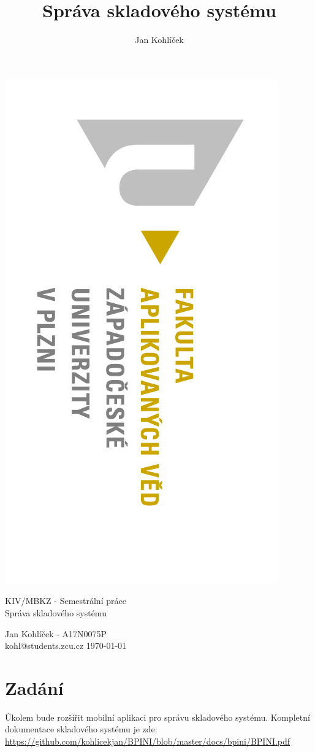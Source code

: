 \documentclass[12pt]{report}
\title{Správa skladového systému}
\author{Jan Kohlíček}
\begin{document}
\begin{titlepage}
\begin{flushleft} 
{\includegraphics[width=.5\textwidth]{../images/fav_logo.jpg}\\[3cm]}
\end{flushleft}
\begin{center}

{\Large KIV/MBKZ - Semestrální práce }
\\[0.3cm]
{\Huge Správa skladového systému}
\vspace{1.7cm}

{\Large Jan Kohlíček - A17N0075P}\\
\vspace{0.2cm}
{\normalsize kohl@students.zcu.cz }
\vfill
{\large \today}
\end{center}
\end{titlepage}

\tableofcontents
\thispagestyle{empty}



\chapter{Zadání}
\setcounter{page}{1}

Úkolem bude rozšířit mobilní aplikaci pro správu skladového systému. Kompletní dokumentace skladového systému je zde: \url{https://github.com/kohlicekjan/BPINI/blob/master/docs/bpini/BPINI.pdf}
\end{document}
